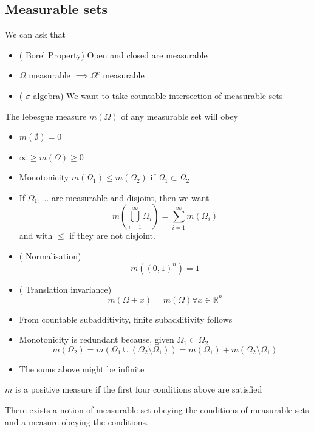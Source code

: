 \documentclass[../main.tex]{subfiles}
\begin{document}
\subsection{Measurable sets}
We can ask that
\begin{itemize}
\item ( Borel Property) Open and closed are measurable
\item $\Omega$ measurable $\implies \Omega^{c} $ measurable
\item ( $\sigma$-algebra) We want to take countable intersection of measurable sets
\end{itemize}
\begin{defn}
	The lebesgue measure $m( \Omega) $ of any measurable set will obey
	\begin{itemize}
	\item $m( \emptyset) =0$ 
	\item $ \infty \geq m( \Omega) \geq 0$ 
	\item Monotonicity $m( \Omega_1) \leq m( \Omega_2) $ if $\Omega_1 \subset \Omega_2$ 
	\item If $\Omega_1,\ldots$ are measurable and disjoint, then we want 
		\[ 
		m( \bigcup_{i=1}^{ \infty } \Omega_i) = \sum_{i=1}^{ \infty } m( \Omega_i) 
		\]
		and with $ \leq $ if they are not disjoint.
	\item ( Normalisation) 
		\[ 
		m( ( 0,1)^{n}) =1
		\]
	
	\item ( Translation invariance) 
		\[ 
		m( \Omega+x) =m( \Omega) \forall x \in \mathbb{R}^{n}
		\]
		
	\end{itemize}
	
\end{defn}
\begin{rmq}
\begin{itemize}
\item From countable subadditivity, finite subadditivity follows
\item Monotonicity is redundant because, given $\Omega_1 \subset \Omega_2$ 
	\[ 
m( \Omega_2) = m( \Omega_1 \cup ( \Omega_2\setminus\Omega_1 )) 	= m( \Omega_1) + m( \Omega_2\setminus\Omega_1) 
	\]

\item The sums above might be infinite
	
\end{itemize}
\end{rmq}
\begin{rmq}
$m$ is a positive measure if the first four conditions above are satisfied
\end{rmq}
\begin{thm}
	There exists a notion of measurable set obeying the conditions of measurable sets and a measure obeying the conditions.
\end{thm}
\end{document}
